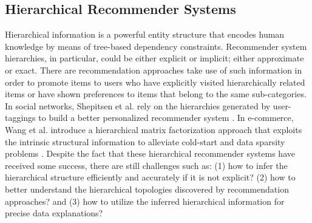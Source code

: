 \subsection{Hierarchical Recommender Systems}
Hierarchical information is a powerful entity structure that encodes human knowledge by means of tree-based dependency constraints. Recommender system hierarchies, in particular, could be either explicit or implicit; either approximate or exact.  There are recommendation approaches take use of such information in order to promote items to users who have explicitly visited hierarchically related items or have shown preferences to items that belong to the same sub-categories.  In social networks, Shepitsen et al. rely on the hierarchies generated by user-taggings to build a better personalized recommender system \cite{shepitsen2008personalized}.  In e-commerce, Wang et al.  introduce a hierarchical matrix factorization approach that exploits the intrinsic structural information to alleviate cold-start and data sparsity problems \cite{wang2018exploring}.  Despite the fact that these hierarchical recommender systems have received some success, there are still challenges such as: (1) how to infer the hierarchical structure efficiently and accurately if it is not explicit? (2) how to better understand the hierarchical topologies discovered by recommendation approaches? and (3) how to utilize the inferred hierarchical information for precise data explanations?

